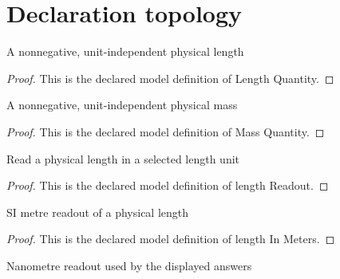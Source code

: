 \section{Declaration topology}
\begin{definition}
  \label{def:physics:phyx-mini-0508:phyxminiproblems-problemphyxmini0508-lengthquantity}
  A nonnegative, unit-independent physical length
\end{definition}
\begin{proof}
  This is the declared model definition of Length Quantity.
\end{proof}
\begin{definition}
  \label{def:physics:phyx-mini-0508:phyxminiproblems-problemphyxmini0508-massquantity}
  A nonnegative, unit-independent physical mass
\end{definition}
\begin{proof}
  This is the declared model definition of Mass Quantity.
\end{proof}
\begin{definition}
  \label{def:physics:phyx-mini-0508:phyxminiproblems-problemphyxmini0508-lengthreadout}
  Read a physical length in a selected length unit
\end{definition}
\begin{proof}
  This is the declared model definition of length Readout.
\end{proof}
\begin{definition}
  \label{def:physics:phyx-mini-0508:phyxminiproblems-problemphyxmini0508-lengthinmeters}
  SI metre readout of a physical length
\end{definition}
\begin{proof}
  This is the declared model definition of length In Meters.
\end{proof}
\begin{definition}
  \label{def:physics:phyx-mini-0508:phyxminiproblems-problemphyxmini0508-lengthinnanometers}
  Nanometre readout used by the displayed answers
\end{definition}
